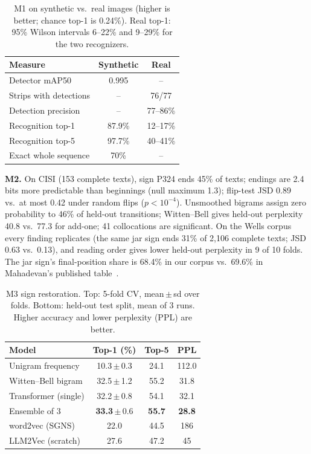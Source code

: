 \documentclass[11pt,a4paper,twocolumn]{article}
\begin{document}
\begin{table}[h]
\centering
\small
\begin{tabular}{lcc}
\toprule
Measure & Synthetic & Real \\
\midrule
Detector mAP50 & 0.995 & -- \\
Strips with detections & -- & 76/77 \\
Detection precision & -- & 77--86\% \\
Recognition top-1 & 87.9\% & 12--17\% \\
Recognition top-5 & 97.7\% & 40--41\% \\
Exact whole sequence & 70\% & -- \\
\bottomrule
\end{tabular}
\caption{M1 on synthetic vs.\ real images (higher is better; chance top-1 is 0.24\%). Real top-1: 95\%
Wilson intervals 6--22\% and 9--29\% for the two recognizers.}
\label{tab:m1}
\end{table}

\textbf{M2.} On CISI (153 complete texts), sign P324 ends 45\% of texts; endings are 2.4 bits more
predictable than beginnings (null maximum 1.3); flip-test JSD 0.89 vs.\ at most 0.42 under random flips
($p<10^{-4}$). Unsmoothed bigrams assign zero probability to 46\% of held-out transitions; Witten--Bell
gives held-out perplexity 40.8 vs.\ 77.3 for add-one; 41 collocations are significant. On the Wells
corpus every finding replicates (the same jar sign ends 31\% of 2,106 complete texts; JSD 0.63 vs.\
0.13), and reading order gives lower held-out perplexity in 9 of 10 folds.
The jar sign's final-position share is 68.4\% in our corpus vs.\ 69.6\% in Mahadevan's published
table~\cite{mahadevan1977}.

\begin{table}[h]
\centering
\small
\setlength{\tabcolsep}{4pt}
\begin{tabular}{lccc}
\toprule
Model & Top-1 (\%) & Top-5 & PPL \\
\midrule
Unigram frequency & 10.3\,$\pm$\,0.3 & 24.1 & 112.0 \\
Witten--Bell bigram & 32.5\,$\pm$\,1.2 & 55.2 & 31.8 \\
Transformer (single) & 32.2\,$\pm$\,0.8 & 54.1 & 32.1 \\
Ensemble of 3 & \textbf{33.3}\,$\pm$\,0.6 & \textbf{55.7} & \textbf{28.8} \\
\midrule
word2vec (SGNS) & 22.0 & 44.5 & 186 \\
LLM2Vec (scratch) & 27.6 & 47.2 & 45 \\
\bottomrule
\end{tabular}
\caption{M3 sign restoration. Top: 5-fold CV, mean\,$\pm$\,sd over folds. Bottom: held-out test split,
mean of 3 runs. Higher accuracy and lower perplexity (PPL) are better.}
\label{tab:m3}
\end{table}
\end{document}
